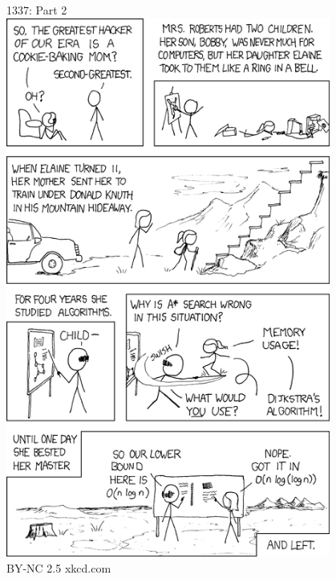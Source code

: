 \documentclass[a6paper,fontsize=10pt,twoside,open=right]{scrbook}
\begin{document}
\begin{center}
  \tiny{1337: Part 2}\\
  \includegraphics[keepaspectratio,width=0.8\textwidth]{elements/images/1337_part_2.png}\\
  \tiny{BY-NC 2.5 xkcd.com}
\end{center}\par
\vspace{10pt}
\vfill
\newpage
\null
\end{document}
